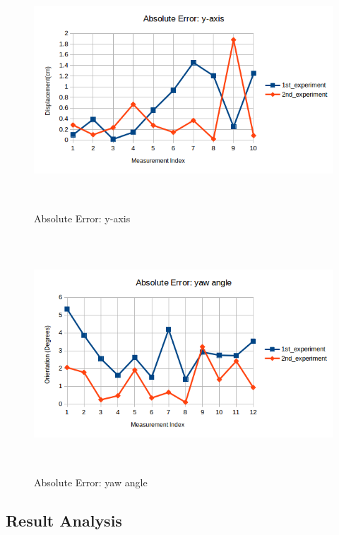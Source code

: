 \begin{figure}[!h]
\begin{center}
\includegraphics[width=5in, height=3.5in]{figures05/abs_error_y.png}
\caption{Absolute Error: y-axis}
\label{fig:absy}
\end{center}
\end{figure}

\begin{figure}[!h]
\begin{center}
\includegraphics[width=5in, height=3.5in]{figures05/abs_error_yaw.png}
\caption{Absolute Error: yaw angle}
\label{fig:absw}
\end{center}
\end{figure}


\subsection{Result Analysis}

